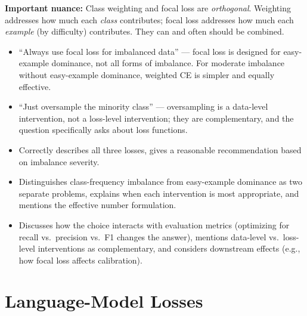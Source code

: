 \begin{interviewq}
\textbf{Important nuance:} Class weighting and focal loss are \textit{orthogonal}. Weighting addresses how much each \textit{class} contributes; focal loss addresses how much each \textit{example} (by difficulty) contributes. They can and often should be combined.

\redflags
\begin{itemize}
    \item ``Always use focal loss for imbalanced data'' --- focal loss is designed for easy-example dominance, not all forms of imbalance. For moderate imbalance without easy-example dominance, weighted CE is simpler and equally effective.
    \item ``Just oversample the minority class'' --- oversampling is a data-level intervention, not a loss-level intervention; they are complementary, and the question specifically asks about loss functions.
\end{itemize}


\goodgreat
\begin{itemize}
    \item {} Correctly describes all three losses, gives a reasonable recommendation based on imbalance severity.
    \item {} Distinguishes class-frequency imbalance from easy-example dominance as two separate problems, explains when each intervention is most appropriate, and mentions the effective number formulation.
    \item {} Discusses how the choice interacts with evaluation metrics (optimizing for recall vs.\ precision vs.\ F1 changes the answer), mentions data-level vs.\ loss-level interventions as complementary, and considers downstream effects (e.g., how focal loss affects calibration).
\end{itemize}

\end{interviewq}

\section{Language-Model Losses}
\label{sec:lm_losses}

